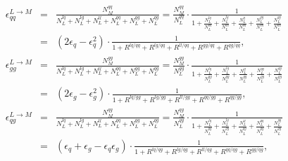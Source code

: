 \begin{eqnarray}
\epsilon_{qq}^{L \rightarrow M} & = & \frac{N_{M}^{qq}}{N_{L}^{lq}+N_{L}^{lg}+N_{L}^{ll}+N_{L}^{qq}+N_{L}^{gg}+N_{L}^{qg}} =
\frac{N_{M}^{qq}}{N_{L}^{qq}} \cdot \frac{1}{1 + \frac{N_{L}^{lq}}{N_{L}^{qq}} + \frac{N_{L}^{lg}}{N_{L}^{qq}} + \frac{N_{L}^{ll}}{N_{L}^{qq}} + \frac{N_{L}^{gg}}{N_{L}^{qq}} + \frac{N_{L}^{qg}}{N_{L}^{qq}}} \nonumber \\
& = & \left( 2 \epsilon_{q} - \epsilon_{q}^{2} \right) \cdot \frac{1}{1 + R^{lq/qq} + R^{lg/qq} + R^{ll/qq} + R^{gg/qq} + R^{qg/qq}}, \label{eq:eps14__}\\
\epsilon_{gg}^{L \rightarrow M} & = & \frac{N_{M}^{gg}}{N_{L}^{lq}+N_{L}^{lg}+N_{L}^{ll}+N_{L}^{qq}+N_{L}^{gg}+N_{L}^{qg}} =
\frac{N_{M}^{gg}}{N_{L}^{gg}} \cdot \frac{1}{1 + \frac{N_{L}^{lq}}{N_{L}^{gg}} + \frac{N_{L}^{lg}}{N_{L}^{gg}} + \frac{N_{L}^{ll}}{N_{L}^{gg}} + \frac{N_{L}^{qq}}{N_{L}^{gg}} + \frac{N_{L}^{qg}}{N_{L}^{gg}}} \nonumber \\
& = & \left( 2 \epsilon_{g} - \epsilon_{g}^{2} \right) \cdot \frac{1}{1 + R^{lq/gg} + R^{lg/gg} + R^{ll/gg} + R^{qq/gg} + R^{qg/gg}}, \label{eq:eps15__}\\
\epsilon_{qg}^{L \rightarrow M} & = & \frac{N_{M}^{qg}}{N_{L}^{lq}+N_{L}^{lg}+N_{L}^{ll}+N_{L}^{qq}+N_{L}^{gg}+N_{L}^{qg}} =
\frac{N_{M}^{qg}}{N_{L}^{qg}} \cdot \frac{1}{1 + \frac{N_{L}^{lq}}{N_{L}^{qg}} + \frac{N_{L}^{lg}}{N_{L}^{qg}} + \frac{N_{L}^{ll}}{N_{L}^{qg}} + \frac{N_{L}^{qq}}{N_{L}^{qg}} + \frac{N_{L}^{gg}}{N_{L}^{qg}}} \nonumber \\
& = & \left( \epsilon_{q} + \epsilon_{g} - \epsilon_{q} \epsilon_{g} \right) \cdot \frac{1}{1 + R^{lq/qg} + R^{lg/qg} + R^{ll/qg} + R^{qq/qg} + R^{gg/qg}}, \label{eq:eps16__}
\end{eqnarray}

